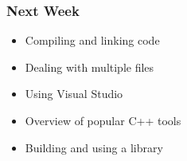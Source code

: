 \documentclass[glossy]{beamer}
\begin{document}

\begin{frame}[fragile=singleslide]
  \frametitle{Next Week}
  \begin{itemize}
    \item Compiling and linking code
    \item Dealing with multiple files
    \item Using Visual Studio
    \item Overview of popular C++ tools
    \item Building and using a library
  \end{itemize}
\end{frame}
\end{document}
